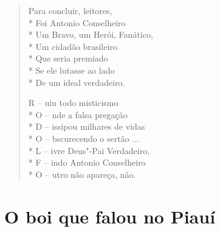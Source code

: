 \begin{verse}
Para concluir, leitores,\\*
Foi Antonio Conselheiro\\*
Um Bravo, um Herói, Fanático,\\*
Um cidadão brasileiro\\*
Que seria premiado\\*
Se ele lutasse ao lado\\*
De um ideal verdadeiro.

R -- uiu todo misticismo\\*
O -- nde a falsa pregação\\*
D -- issipou milhares de vidas\\*
O -- bscurecendo o sertão ...\\*
L -- ivre Deus"-Pai Verdadeiro,\\*
F -- indo Antonio Conselheiro\\*
O -- utro não apareça, não.
\end{verse}

\chapter{O boi que falou no Piauí}

